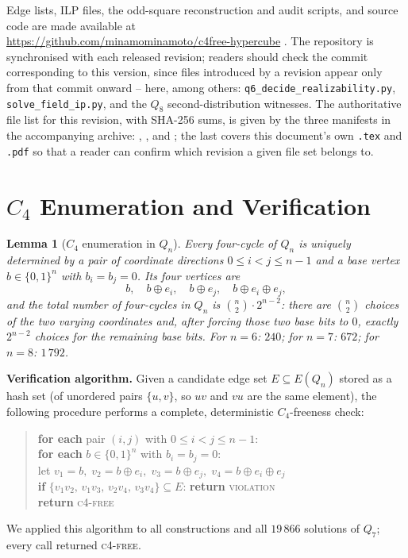 \documentclass[12pt,a4paper]{article}
\newtheorem{lemma}[theorem]{Lemma}
\theoremstyle{definition}
\begin{document}
Edge lists, ILP files, the odd-square reconstruction and audit scripts, and
source code are made available at\\
\url{https://github.com/minamominamoto/c4free-hypercube}
. The repository is synchronised with each released revision; readers should
check the commit corresponding to this version, since files introduced by
a revision appear only from that commit onward -- here, among others:
\texttt{q6\_decide\_realizability.py},
\texttt{solve\_field\_ip.py},
and the $Q_8$ second-distribution witnesses. The authoritative file list for this
revision, with SHA-256 sums, is given by the three manifests in the
accompanying archive:
,
, and
;
the last covers this document's own \texttt{.tex} and \texttt{.pdf} so
that a reader can confirm which revision a given file set belongs to.



\section{\texorpdfstring{$C_4$}{C4} Enumeration and Verification}\label{sec:verify}

\begin{lemma}[$C_4$ enumeration in $Q_n$]\label{lem:c4}
Every four-cycle of $Q_n$ is uniquely determined by a pair of coordinate
directions $0\le i<j\le n-1$ and a base vertex $b\in\{0,1\}^n$ with
$b_i=b_j=0$.  Its four vertices are
\[
  b,\quad b\oplus e_i,\quad b\oplus e_j,\quad b\oplus e_i\oplus e_j,
\]
and the total number of four-cycles in $Q_n$ is $\binom{n}{2}\cdot2^{n-2}$:
there are $\binom{n}{2}$ choices of the two varying coordinates and, after
forcing those two base bits to $0$, exactly $2^{n-2}$ choices for the remaining
base bits. For $n=6$: $240$; for $n=7$: $672$; for $n=8$: $1\,792$.
\end{lemma}

\noindent\textbf{Verification algorithm.}\quad
Given a candidate edge set $E\subseteq E(Q_n)$ stored as a hash set
(of unordered pairs $\{u,v\}$, so $uv$ and $vu$ are the same element),
the following procedure performs a complete, deterministic $C_4$-freeness check:
\begin{quote}\small
\textbf{for each} pair $(i,j)$ with $0\le i<j\le n-1$:\\
\quad\textbf{for each} $b\in\{0,1\}^n$ with $b_i=b_j=0$:\\
\quad\quad let $v_1=b,\;v_2=b\oplus e_i,\;v_3=b\oplus e_j,\;v_4=b\oplus e_i\oplus e_j$\\
\quad\quad \textbf{if} $\{v_1v_2,\,v_1v_3,\,v_2v_4,\,v_3v_4\}\subseteq E$:
  \textbf{return} \textsc{violation}\\
\textbf{return} \textsc{c4-free}
\end{quote}
We applied this algorithm to all constructions and all $19\,866$ solutions
of $Q_7$; every call returned \textsc{c4-free}.
\end{document}
